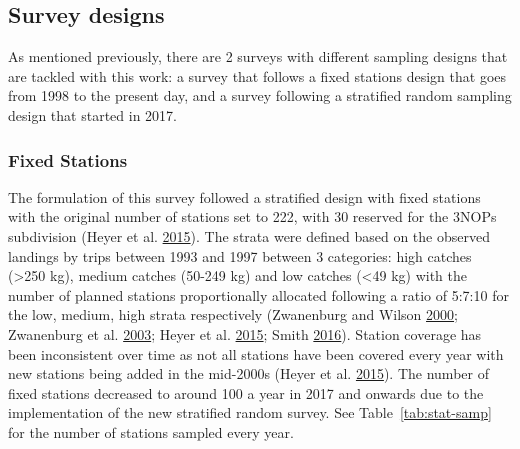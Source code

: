 \documentclass[12pt]{article}\usepackage[]{graphicx}\usepackage[]{color}
\begin{document}
\hypertarget{survey-designs}{%
\subsection{Survey designs}\label{survey-designs}}

As mentioned previously, there are 2 surveys with different sampling designs that are tackled with this work: a survey that follows a fixed stations design that goes from 1998 to the present day, and a survey following a stratified random sampling design that started in 2017.

\hypertarget{fixed-stations}{%
\subsubsection{Fixed Stations}\label{fixed-stations}}

The formulation of this survey followed a stratified design with fixed stations with the original number of stations set to 222, with 30 reserved for the 3NOPs subdivision (Heyer et al. \protect\hyperlink{ref-DenHeyer2015}{2015}). The strata were defined based on the observed landings by trips between 1993 and 1997 between 3 categories: high catches (\textgreater250 kg), medium catches (50-249 kg) and low catches (\textless49 kg) with the number of planned stations proportionally allocated following a ratio of 5:7:10 for the low, medium, high strata respectively (Zwanenburg and Wilson \protect\hyperlink{ref-Zwanenburg2000}{2000}; Zwanenburg et al. \protect\hyperlink{ref-Zwanenburg2003}{2003}; Heyer et al. \protect\hyperlink{ref-DenHeyer2015}{2015}; Smith \protect\hyperlink{ref-Smith2016a}{2016}). Station coverage has been inconsistent over time as not all stations have been covered every year with new stations being added in the mid-2000s (Heyer et al. \protect\hyperlink{ref-DenHeyer2015}{2015}). The number of fixed stations decreased to around 100 a year in 2017 and onwards due to the implementation of the new stratified random survey. See Table~\ref{tab:stat-samp} for the number of stations sampled every year.
\end{document}
